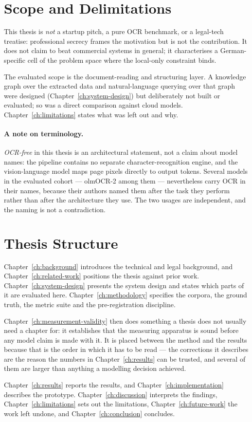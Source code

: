 \section{Scope and Delimitations}
\label{sec:scope}

This thesis is \emph{not} a startup pitch, a pure \ac{OCR} benchmark, or a
legal-tech treatise: professional secrecy frames the motivation but is not the
contribution. It does not claim to beat commercial systems in general; it
characterises a German-specific cell of the problem space where the local-only
constraint binds.

The evaluated scope is the document-reading and structuring layer. A knowledge
graph over the extracted data and natural-language querying over that graph were
designed (Chapter~\ref{ch:system-design}) but deliberately not built or evaluated;
so was a direct comparison against cloud models. Chapter~\ref{ch:limitations}
states what was left out and why.

\paragraph{A note on terminology.} \emph{\ac{OCR}-free} in this thesis is an
architectural statement, not a claim about model names: the pipeline contains no
separate character-recognition engine, and the vision-language model maps page
pixels directly to output tokens. Several models in the evaluated cohort ---
olmOCR-2 among them --- nevertheless carry \ac{OCR} in their names, because
their authors named them after the task they perform rather than after the
architecture they use. The two
usages are independent, and the naming is not a contradiction.

\section{Thesis Structure}
\label{sec:structure}

Chapter~\ref{ch:background} introduces the technical and legal background, and
Chapter~\ref{ch:related-work} positions the thesis against prior work.
Chapter~\ref{ch:system-design} presents the system design and states which parts
of it are evaluated here. Chapter~\ref{ch:methodology} specifies the corpora, the
ground truth, the metric suite and the pre-registration discipline.

Chapter~\ref{ch:measurement-validity} then does something a thesis does not
usually need a chapter for: it establishes that the measuring apparatus is sound
before any model claim is made with it. It is placed between the method and the
results because that is the order in which it has to be read --- the corrections
it describes are the reason the numbers in Chapter~\ref{ch:results} can be
trusted, and several of them are larger than anything a modelling decision
achieved.

Chapter~\ref{ch:results} reports the results, and
Chapter~\ref{ch:implementation} describes the prototype.
Chapter~\ref{ch:discussion} interprets the findings,
Chapter~\ref{ch:limitations} sets out the limitations,
Chapter~\ref{ch:future-work} the work left undone, and Chapter~\ref{ch:conclusion} concludes.
